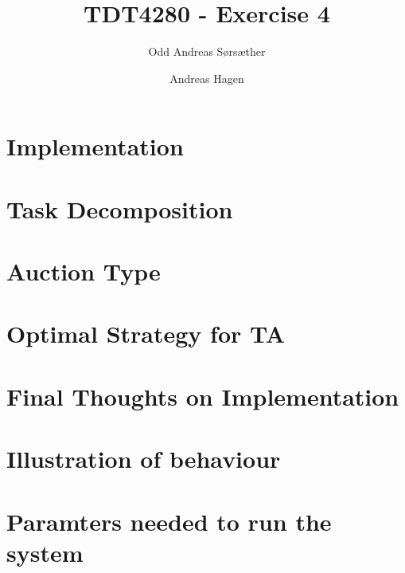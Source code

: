\documentclass[titlepage,norsk]{article}
\title{TDT4280 - Exercise 4}
\author{Odd Andreas Sørsæther \and Andreas Hagen}
\begin{document}
\maketitle

\tableofcontents

\section{Implementation}

\section{Task Decomposition}

\section{Auction Type}

\section{Optimal Strategy for TA}

\section{Final Thoughts on Implementation}

\section{Illustration of behaviour}

\section{Paramters needed to run the system}




\end{document}
